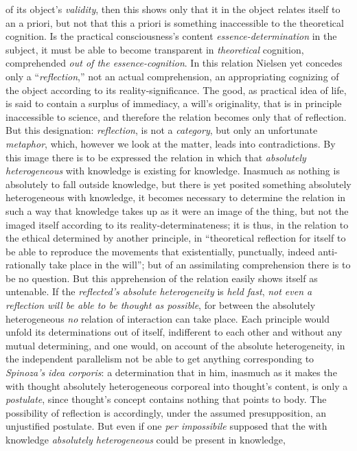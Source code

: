 \documentclass[12pt,a4paper]{book}
\begin{document}
of its object's \emph{validity}, then this shows only that it in the object relates itself to an a priori, but
not that this a priori is something inaccessible to the theoretical cognition. Is the practical
consciousness's content \emph{essence-determination} in the subject, it must be able to become transparent in
\emph{theoretical} cognition, comprehended \emph{out of the essence-cognition}. In this relation Nielsen yet concedes
only a ``\emph{reflection},'' not an actual comprehension, an appropriating cognizing of the object according
to its reality-significance. The good, as practical idea of life, is said to contain a surplus of
immediacy, a will's originality, that is in principle inaccessible to science, and therefore the
relation becomes only that of reflection. But this designation: \emph{reflection}, is not a \emph{category}, but only
an unfortunate \emph{metaphor}, which, however we look at the matter, leads into contradictions. By this image
there is to be expressed the relation in which that \emph{absolutely heterogeneous} with knowledge is
existing for knowledge. Inasmuch as nothing is absolutely to fall outside knowledge, but there is yet
posited something absolutely heterogeneous with knowledge, it becomes necessary to determine the relation
in such a way that knowledge takes up as it were an image of the thing, but not the imaged itself
according to its reality-determinateness; it is thus, in the relation to the ethical determined by another
principle, in ``theoretical reflection for itself to be able to reproduce the movements that existentially,
punctually, indeed anti-rationally take place in the will''; but of an assimilating comprehension there is
to be no question. But this apprehension of the relation easily shows itself as untenable. If the
\emph{reflected's absolute heterogeneity} is \emph{held fast}, \emph{not even a reflection will be able to be thought as
possible}, for between the absolutely heterogeneous \emph{no} relation of interaction can take place. Each
principle would unfold its determinations out of itself, indifferent to each other and without any mutual
determining, and one would, on account of the absolute heterogeneity, in the independent parallelism not
be able to get anything corresponding to \emph{Spinoza's} \textit{idea corporis}: a determination that in him,
inasmuch as it makes the with thought absolutely heterogeneous corporeal into thought's content, is only a
\emph{postulate}, since thought's concept contains nothing that points to body. The possibility of reflection is
accordingly, under the assumed presupposition, an unjustified postulate. But even if one \textit{per
impossibile} supposed that the with knowledge \emph{absolutely heterogeneous} could be present in knowledge,
\end{document}
